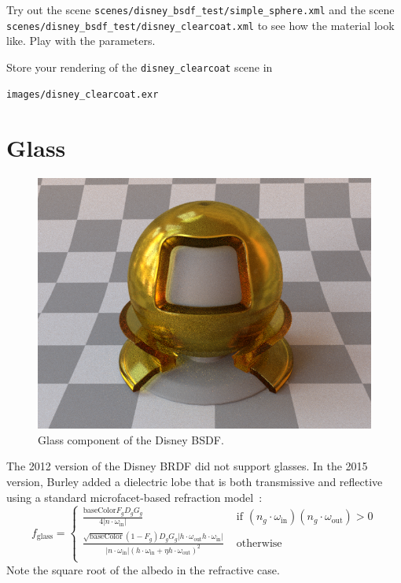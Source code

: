 Try out the scene \lstinline{scenes/disney_bsdf_test/simple_sphere.xml} and the scene \\ \lstinline{scenes/disney_bsdf_test/disney_clearcoat.xml} to see how the material look like. Play with the parameters.

Store your rendering of the \lstinline{disney_clearcoat} scene in
\begin{lstlisting}
images/disney_clearcoat.exr
\end{lstlisting}

\section{Glass}
\begin{figure}
	\centering
	\includegraphics[width=0.5\linewidth]{imgs/disney_glass.png}
	\caption{Glass component of the Disney BSDF.}
\end{figure}

The 2012 version of the Disney BRDF did not support glasses. In the 2015 version, Burley added a dielectric lobe that is both transmissive and reflective using a standard microfacet-based refraction model~\cite{Walter:2007:MMR}:
\begin{equation}
f_{\text{glass}} = \begin{cases}
\frac{\text{baseColor} F_g D_g G_g}{4 |n \cdot \omega_{\text{in}}|} & \mbox{ if } \left(n_g \cdot \omega_{\text{in}}\right) \left(n_g \cdot \omega_{\text{out}}\right) > 0 \\
\frac{\sqrt{\text{baseColor}} (1 - F_g) D_g G_g \left|h \cdot \omega_{\text{out}} h \cdot \omega_{\text{in}} \right|}{
\left|n \cdot \omega_{\text{in}}\right| \left( h \cdot \omega_{\text{in}} + \eta h \cdot \omega_{\text{out}} \right)^2} & \mbox{ otherwise}\\
\end{cases}
\label{eq:f_glass}
\end{equation}
Note the square root of the albedo in the refractive case.

